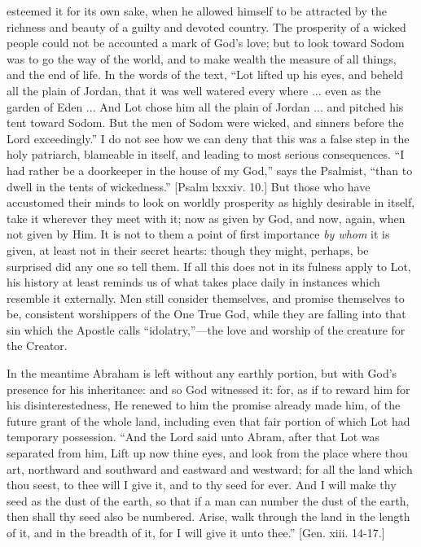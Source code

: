 esteemed it for its own sake, when he allowed himself to be attracted
by the richness and beauty of a guilty and devoted country. The
prosperity of a wicked people could not be accounted a mark of God's
love; but to look toward Sodom was to go the way of the world, and to
make wealth the measure of all things, and the end of life. In the
words of the text, ``Lot lifted up his eyes, and beheld all the
plain of Jordan, that it was well watered every where ... even as the
garden of Eden ... And Lot chose him all the plain of Jordan ... and
pitched his tent toward Sodom. But the men of Sodom were wicked, and
sinners before the Lord exceedingly.'' I do not see how we can
deny that this was a false step in the holy patriarch, blameable in
itself, and leading to most serious consequences. ``I had rather
be a doorkeeper in the house of my God,'' says the Psalmist,
``than to dwell in the tents of wickedness.'' [Psalm lxxxiv.
10.] But those who have accustomed their minds to look on worldly
prosperity as highly desirable in itself, take it wherever they meet
with it; now as given by God, and now, again, when not given by Him.
It is not to them a point of first importance \emph{by whom} it is
given, at least not in their secret hearts: though they might,
perhaps, be surprised did any one so tell them. If all this does not
in its fulness apply to Lot, his history at least reminds us of what
takes place daily in instances which resemble it externally. Men still
consider themselves, and promise themselves to be, consistent
worshippers of the One True God, while they are falling into that sin
which the Apostle calls ``idolatry,''—the love and worship
of the creature for the Creator.

In the meantime Abraham is left without any earthly portion, but
with God's presence for his inheritance: and so God witnessed it:
for, as if to reward him for his disinterestedness, He renewed to him
the promise already made him, of the future grant of the whole land,
including even that fair portion of which Lot had temporary
possession. ``And the Lord said unto Abram, after that Lot was
separated from him, Lift up now thine eyes, and look from the place
where thou art, northward and southward and eastward and westward; for
all the land which thou seest, to thee will I give it, and to thy seed
for ever. And I will make thy seed as the dust of the earth, so that
if a man can number the dust of the earth, then shall thy seed also be
numbered. Arise, walk through the land in the length of it, and in the
breadth of it, for I will give it unto thee.'' [Gen. xiii. 14-17.]


